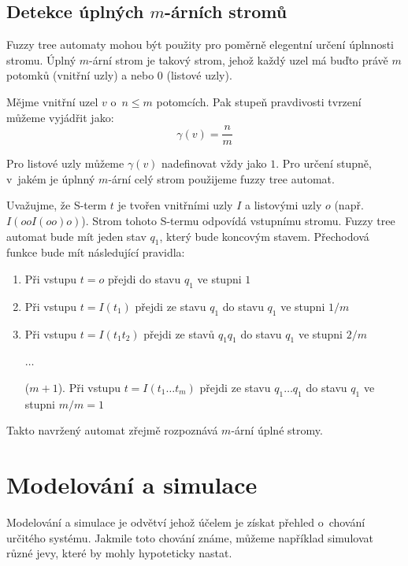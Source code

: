 \subsection{Detekce úplných $m$-árních stromů} \label{subs:DetComTrees}
Fuzzy tree automaty mohou být použity pro poměrně elegentní určení úplnnosti stromu. Úplný $m$-ární strom je takový strom, jehož každý uzel má buďto právě $m$ potomků (vnitřní uzly) a nebo $0$ (listové uzly).

Mějme vnitřní uzel $v$ o~$n \leq m$ potomcích. Pak stupeň pravdivosti tvrzení  můžeme vyjádřit jako:
$$
  \gamma(v) = \frac{n}{m}
$$

Pro listové uzly můžeme $\gamma(v)$ nadefinovat vždy jako $1$. Pro určení stupně, v~jakém je úplnný $m$-ární celý strom použijeme fuzzy tree automat.

Uvažujme, že S-term $t$ je tvořen vnitřními uzly $I$ a listovými uzly $o$ (např. $I(ooI(oo)o)$). Strom tohoto S-termu odpovídá vstupnímu stromu. Fuzzy tree automat bude mít jeden stav $q_1$, který bude koncovým stavem. Přechodová funkce bude mít následující pravidla:
\begin{enumerate}
 \item Při vstupu $t = o$ přejdi do stavu $q_1$ ve stupni $1$
 \item Při vstupu $t = I(t_1)$ přejdi ze stavu $q_1$ do stavu $q_1$ ve stupni $1/m$
 \item Při vstupu $t = I(t_1 t_2)$ přejdi ze stavů $q_1 q_1$ do stavu $q_1$ ve stupni $2/m$
 \item[] $\dots$
 \item[($m + 1$).] Při vstupu $t = I(t_1 \dots t_m)$ přejdi ze stavu $q_1 \dots q_1$ do stavu $q_1$ ve stupni $m/m = 1$
\end{enumerate}

Takto navržený automat zřejmě rozpoznává $m$-ární úplné stromy.

\section{Modelování a simulace}

Modelování a simulace je odvětví jehož účelem je získat přehled o~chování určitého systému. Jakmile toto chování známe, můžeme například simulovat různé jevy, které by mohly hypoteticky nastat.

